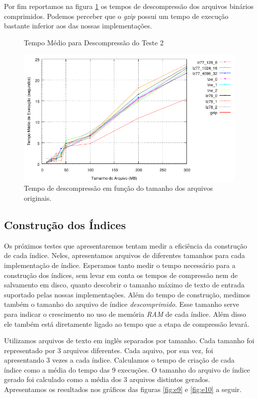 \documentclass[]{article}
\newcommand{\figref}[1]{figura \ref{#1}}
\begin{document}
Por fim reportamos na \figref{fig:e8} os tempos de descompressão dos arquivos binários comprimidos. Podemos perceber que o \textit{gzip} possui um tempo de execução bastante inferior aos das nossas implementações. 


\begin{figure}
	{\centering Tempo Médio para Descompressão do Teste 2\par}
	\includegraphics{images/binario_descompressao}
\caption{Tempo de descompressão em função do tamanho dos arquivos originais.}
\label{fig:e8}
\end{figure}


\subsection{Construção dos Índices}

Os próximos testes que apresentaremos tentam medir a eficiência da construção de cada índice. Neles, apresentamos arquivos de diferentes tamanhos para cada implementação de índice. Esperamos tanto medir o tempo necessário para a construção dos índices, sem levar em conta os tempos de compressão nem de salvamento em disco, quanto descobrir o tamanho máximo de texto de entrada suportado pelas nossas implementações. Além do tempo de construção, medimos também o tamanho do arquivo de índice \textit{descomprimido}. Esse tamanho serve para indicar o crescimento no uso de memória \textit{RAM} de cada índice. Além disso ele também está diretamente ligado ao tempo que a etapa de compressão levará.

Utilizamos arquivos de texto em inglês separados por tamanho. Cada tamanho foi representado por 3 arquivos diferentes. Cada aquivo, por sua vez, foi apresentando 3 vezes a cada índice. Calculamos o tempo de criação de cada índice como a média do tempo das 9 execuções. O tamanho do arquivo de índice gerado foi calculado como a média dos 3 arquivos distintos gerados. Apresentamos os resultados nos gráficos das figuras \ref{fig:e9} e \ref{fig:e10} a seguir.
\end{document}
